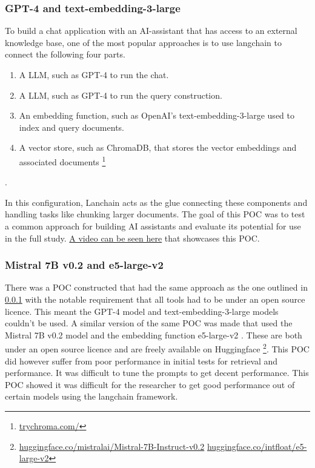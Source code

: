 \subsubsection{GPT-4 and text-embedding-3-large}
\label{sec:poc_gpt_langchain}


To build a chat application with an AI-assistant that has access to an external knowledge base, one of the most popular approaches is to use langchain to connect the following four parts.


\begin{enumerate}
        \item A \gls{LLM}, such as GPT-4 to run the chat.
        \item A \gls{LLM}, such as GPT-4 to run the query construction.
        \item An embedding function, such as OpenAI’s text-embedding-3-large used to index and query documents.
        \item A vector store, such as ChromaDB, that stores the vector embeddings and associated documents \footnote{\href{https://www.trychroma.com/}{trychroma.com/}}
\end{enumerate}.


In this configuration, Lanchain acts as the glue connecting these components and handling tasks like chunking larger documents. The goal of this \gls{POC} was to test a common approach for building AI assistants and evaluate its potential for use in the full study. \href{https://www.youtube.com/watch?v=bKjxi-NKRHo}{A video can be seen here} that showcases this \gls{POC}.


\subsubsection{Mistral 7B v0.2 and e5-large-v2}


There was a \gls{POC} constructed that had the same approach as the one outlined in \ref{sec:poc_gpt_langchain} with the notable requirement that all tools had to be under an open source licence. This meant the GPT-4 model and text-embedding-3-large models couldn’t be used. A similar version of the same \gls{POC} was made that used the Mistral 7B v0.2 model and the embedding function e5-large-v2 \cite{wang_text_2024}. These are both under an open source licence and are freely available on Huggingface \footnote{\href{https://huggingface.co/mistralai/Mistral-7B-Instruct-v0.2}{huggingface.co/mistralai/Mistral-7B-Instruct-v0.2} \href{https://huggingface.co/intfloat/e5-large-v2}{huggingface.co/intfloat/e5-large-v2}}. This \gls{POC} did however suffer from poor performance in initial tests for retrieval and performance. It was difficult to tune the prompts to get decent performance. This \gls{POC} showed it was difficult for the researcher to get good performance out of certain models using the langchain framework.


